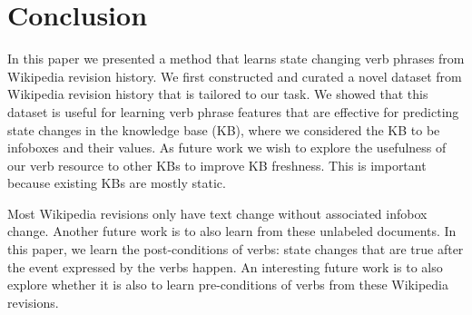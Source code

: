 \section{Conclusion}
In this paper we presented a method that learns state changing verb phrases from Wikipedia revision history.
We first constructed and curated a novel dataset from Wikipedia revision history that is tailored to our task.  We showed that this dataset is useful for learning verb phrase features that are effective for predicting state changes in the knowledge base (KB), where we considered the KB to be infoboxes and their values. As future work we wish to explore the usefulness of  our verb resource to other KBs to improve KB freshness. This is important because existing KBs are mostly static.

Most Wikipedia revisions only have text change without associated infobox change. Another future work is to also learn from these unlabeled documents. In this paper, we learn the post-conditions of verbs: state changes that are true after the event expressed by the verbs happen. An interesting future work is to also explore whether it is also to learn pre-conditions of verbs from these Wikipedia revisions.%


